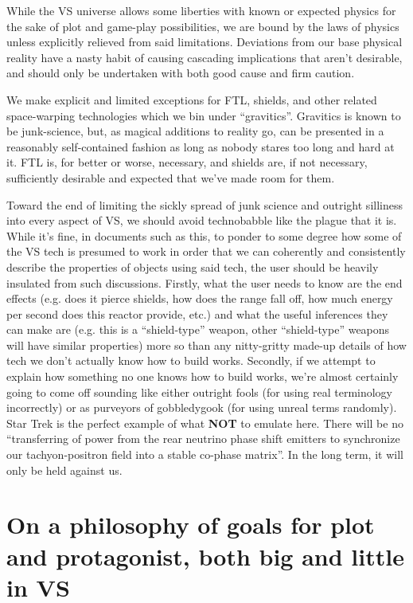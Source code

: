 \begin{itemize}
While the VS universe allows some liberties with known or
expected physics for the sake of plot and game-play possibilities, we
are bound by the laws of physics unless explicitly relieved from said
limitations. Deviations from our base physical reality have a nasty
habit of causing cascading implications that aren't desirable, and
should only be undertaken with both good cause and firm caution. 

We make explicit and limited exceptions for FTL, shields, and other
related space-warping technologies which we bin under
``gravitics''. Gravitics is known to be junk-science, but, as magical
additions to reality go, can be presented in a reasonably
self-contained fashion as long as nobody stares too long and hard at
it. FTL is, for better or worse, necessary, and shields are, if not
necessary, sufficiently desirable and expected that we've made room
for them.

Toward the end of limiting the sickly spread of junk science and
outright silliness into every aspect of VS, we should avoid
technobabble like the plague that it is. While it's fine, in documents
such as this, to ponder to some degree how some of the VS tech is
presumed to work in order that we can coherently and consistently
describe the properties of objects using said tech, the user should be
heavily insulated from such discussions. Firstly, what the user needs
to know are the end effects (e.g. does it pierce shields, how does the
range fall off, how much energy per second does this reactor provide,
etc.) and what the useful inferences they can make are (e.g. this is
a ``shield-type'' weapon, other ``shield-type'' weapons will have
similar properties) more so than any nitty-gritty made-up details of
how tech we don't actually know how to build works. Secondly, if we
attempt to explain how something no one knows how to build works,
we're almost certainly going to come off sounding like either outright
fools (for using real terminology incorrectly) or as purveyors of
gobbledygook (for using unreal terms randomly). Star Trek is the
perfect example of what {\bf NOT} to emulate here. There will be no
``transferring of power from the rear neutrino phase shift emitters
to synchronize our tachyon-positron field into a stable
co-phase matrix''. In the long term, it will only be held against us.

\end{itemize}

\section{On a philosophy of goals for plot and protagonist, both big and little in VS}

